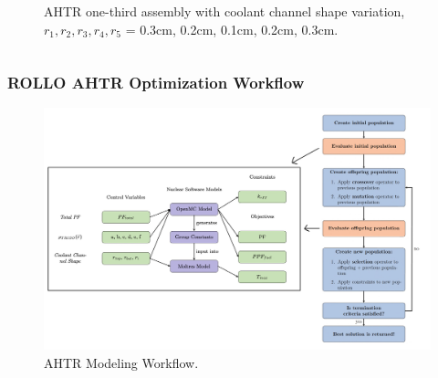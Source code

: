\begin{frame}
\begin{columns}
\begin{column}{0.5\textwidth}
\begin{figure}
                \caption{AHTR one-third assembly with coolant channel shape variation, 
                $r_1, r_2, r_3, r_4, r_5$ = 0.3cm, 0.2cm, 0.1cm, 0.2cm, 0.3cm.}
            \end{figure}
        \end{column}
        \end{columns}
\end{frame}

\begin{frame}
    \frametitle{ROLLO AHTR Optimization Workflow}
    \begin{figure}
        \includegraphics[width=0.95\linewidth]{figures/ahtr-modeling-workflow.png} 
        \caption{AHTR Modeling Workflow.}
    \end{figure}
\end{frame}



